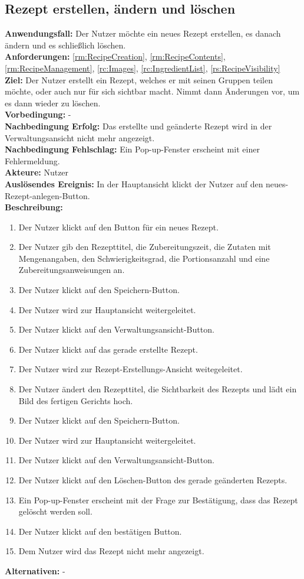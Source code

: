\documentclass[parskip=full]{scrartcl}
\begin{document}
\subsection{Rezept erstellen, ändern und löschen}
\textbf{Anwendungsfall:} Der Nutzer möchte ein neues Rezept erstellen, es danach ändern und es schließlich löschen.\\
\textbf{Anforderungen:} \ref{rm:RecipeCreation}, \ref{rm:RecipeContents}, \ref{rm:RecipeManagement}, \ref{rc:Images}, \ref{rc:IngredientList}, \ref{rs:RecipeVisibility}\\
\textbf{Ziel:} Der Nutzer erstellt ein Rezept, welches er mit seinen Gruppen teilen möchte, oder auch nur für sich sichtbar macht. Nimmt dann Änderungen vor, um es dann wieder zu löschen.\\
\textbf{Vorbedingung:} -\\
\textbf{Nachbedingung Erfolg:} Das erstellte und geänderte Rezept wird in der Verwaltungsansicht nicht mehr angezeigt.  \\
\textbf{Nachbedingung Fehlschlag:} Ein Pop-up-Fenster erscheint mit einer Fehlermeldung.\\
\textbf{Akteure:} Nutzer\\
\textbf{Auslösendes Ereignis:} In der Hauptansicht klickt der Nutzer auf den neues-Rezept-anlegen-Button.\\
\textbf{Beschreibung:}
\begin{enumerate}
    \item Der Nutzer klickt auf den Button für ein neues Rezept.
    \item Der Nutzer gib den Rezepttitel, die Zubereitungszeit, die Zutaten mit Mengenangaben, den Schwierigkeitsgrad, die Portionsanzahl und eine Zubereitungsanweisungen an.
    \item Der Nutzer klickt auf den Speichern-Button.
    \item Der Nutzer wird zur Hauptansicht weitergeleitet.
    \item Der Nutzer klickt auf den Verwaltungsansicht-Button.
    \item Der Nutzer klickt auf das gerade erstellte Rezept.
    \item Der Nutzer wird zur Rezept-Erstellungs-Ansicht weitegeleitet.
    \item Der Nutzer ändert den Rezepttitel, die Sichtbarkeit des Rezepts und lädt ein Bild des fertigen Gerichts hoch.
    \item Der Nutzer klickt auf den Speichern-Button.
    \item Der Nutzer wird zur Hauptansicht weitergeleitet.
    \item Der Nutzer klickt auf den Verwaltungsansicht-Button.
    \item Der Nutzer klickt auf den Löschen-Button des gerade geänderten Rezepts.
    \item Ein Pop-up-Fenster erscheint mit der Frage zur Bestätigung, dass das Rezept gelöscht werden soll.
    \item Der Nutzer klickt auf den bestätigen Button.
    \item Dem Nutzer wird das Rezept nicht mehr angezeigt.
\end{enumerate}
\textbf{Alternativen:} -
\newpage
\end{document}
